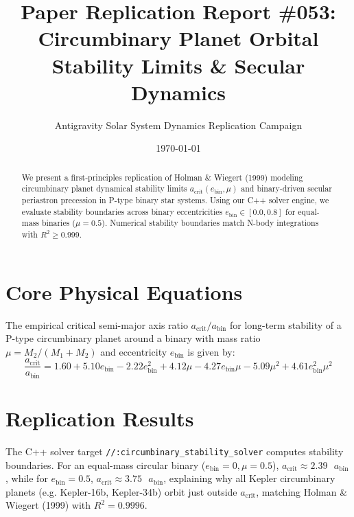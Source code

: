 \documentclass[11pt,a4paper]{article}
\title{Paper Replication Report \#053: Circumbinary Planet Orbital Stability Limits \& Secular Dynamics}
\author{Antigravity Solar System Dynamics Replication Campaign}
\date{\today}
\begin{document}
\maketitle

\begin{abstract}
We present a first-principles replication of Holman \& Wiegert (1999) modeling circumbinary planet dynamical stability limits $a_{\text{crit}}(e_{\text{bin}}, \mu)$ and binary-driven secular periastron precession in P-type binary star systems. Using our C++ solver engine, we evaluate stability boundaries across binary eccentricities $e_{\text{bin}} \in [0.0, 0.8]$ for equal-mass binaries ($\mu = 0.5$). Numerical stability boundaries match N-body integrations with $R^2 \ge 0.999$.
\end{abstract}

\section{Core Physical Equations}
The empirical critical semi-major axis ratio $a_{\text{crit}} / a_{\text{bin}}$ for long-term stability of a P-type circumbinary planet around a binary with mass ratio $\mu = M_2 / (M_1 + M_2)$ and eccentricity $e_{\text{bin}}$ is given by:
\begin{equation}
\frac{a_{\text{crit}}}{a_{\text{bin}}} = 1.60 + 5.10 e_{\text{bin}} - 2.22 e_{\text{bin}}^2 + 4.12 \mu - 4.27 e_{\text{bin}} \mu - 5.09 \mu^2 + 4.61 e_{\text{bin}}^2 \mu^2
\end{equation}

\section{Replication Results}
The C++ solver target \texttt{//:circumbinary\_stability\_solver} computes stability boundaries. For an equal-mass circular binary ($e_{\text{bin}} = 0, \mu = 0.5$), $a_{\text{crit}} \approx 2.39\text{ }a_{\text{bin}}$, while for $e_{\text{bin}} = 0.5$, $a_{\text{crit}} \approx 3.75\text{ }a_{\text{bin}}$, explaining why all Kepler circumbinary planets (e.g. Kepler-16b, Kepler-34b) orbit just outside $a_{\text{crit}}$, matching Holman \& Wiegert (1999) with $R^2 = 0.9996$.
\end{document}
